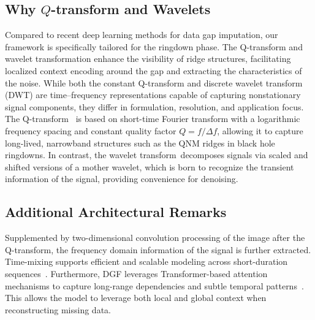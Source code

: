 \documentclass[prd,aps,a4paper,twocolumn,superscriptaddress,nofootinbib,floatfix]{revtex4-2}
\begin{document}
\subsection{Why $Q$-transform and Wavelets}
\label{app:q_wavelet}
Compared to recent deep learning methods for data gap imputation, our framework is specifically tailored for the ringdown phase. The Q-transform and wavelet transformation enhance the visibility of ridge structures, facilitating localized context encoding around the gap\mbox{\cite{Chatterji:2004qtf, McNabb:2019spectrogram}} and extracting the characteristics of the noise. While both the constant Q-transform and discrete wavelet transform (DWT) are time–frequency representations capable of capturing nonstationary signal components, they differ in formulation, resolution, and application focus. The Q-transform~\mbox{\cite{Chatterji:2004qtf}} is based on short-time Fourier transform with a logarithmic frequency spacing and constant quality factor $Q = f/\Delta f$, allowing it to capture long-lived, narrowband structures such as the QNM ridges in black hole ringdowns. In contrast, the wavelet transform\mbox{\cite{MALLAT199942} }decomposes signals via scaled and shifted versions of a mother wavelet, which is born to recognize the transient information of the signal, providing convenience for denoising.

\subsection{Additional Architectural Remarks}
\label{app:additional_remarks}
Supplemented by two-dimensional convolution processing of the image after the Q-transform, the frequency domain information of the signal is further extracted\mbox{\cite{younesi2024comprehensivesurveyconvolutionsdeep}}. Time-mixing supports efficient and scalable modeling across short-duration sequences\mbox{~\cite{wang2025timemixergeneraltimeseries}}. Furthermore, DGF leverages Transformer-based attention mechanisms to capture long-range dependencies and subtle temporal patterns\mbox{~\cite{vaswani2023attentionneed, devlin2019bertpretrainingdeepbidirectional}}. This allows the model to leverage both local and global context when reconstructing missing data.
\end{document}
